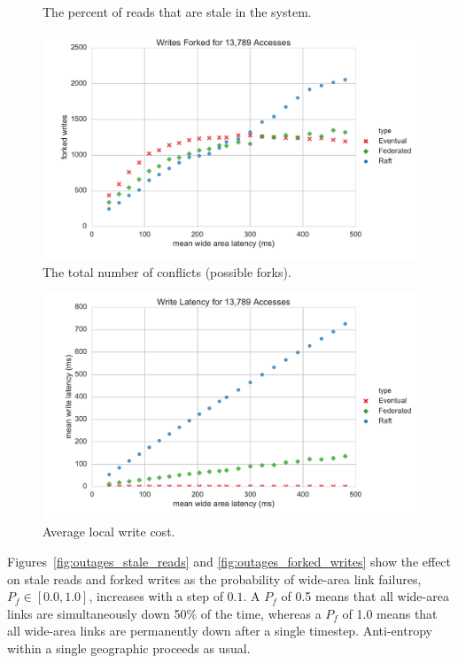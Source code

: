 \documentclass[10pt,conference,letterpaper]{IEEEtran}
\begin{document}
\begin{figure}[t]
      \caption{The percent of reads that are stale in the system.}\label{fig:latency_stale_reads}
    \endminipage
      \includegraphics[width=\linewidth]{figures/latency/forked_writes}
      \caption{The total number of conflicts (possible forks).}\label{fig:latency_forked_writes}
    \endminipage\hfill
\end{figure}

\begin{figure}[t]
    \centering
      \includegraphics[width=\linewidth]{figures/latency/write_latency}
      \caption{Average local write cost.}\label{fig:write_latency}
    \endminipage\hfill
\end{figure}
Figures~\ref{fig:outages_stale_reads} and \ref{fig:outages_forked_writes}
show the effect on stale reads and forked writes
as the probability of wide-area link failures, $P_f \in [0.0,1.0]$, increases
with a step of $0.1$.
A $P_f$ of 0.5 means that all wide-area links are simultaneously down 50\% of
the time,
whereas a $P_f$ of 1.0 means that all wide-area links are permanently down after
a single timestep.
Anti-entropy within a single geographic proceeds as usual.
\end{document}
